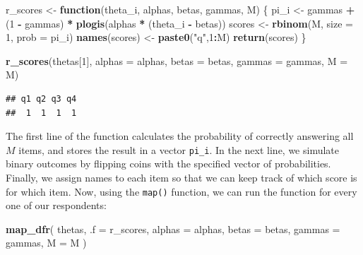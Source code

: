 \documentclass[
]{book}
\newenvironment{Shaded}{\begin{snugshade}}{\end{snugshade}}
\newcommand{\AttributeTok}[1]{\textcolor[rgb]{0.13,0.29,0.53}{#1}}
\newcommand{\ControlFlowTok}[1]{\textcolor[rgb]{0.13,0.29,0.53}{\textbf{#1}}}
\newcommand{\DecValTok}[1]{\textcolor[rgb]{0.00,0.00,0.81}{#1}}
\newcommand{\FunctionTok}[1]{\textcolor[rgb]{0.13,0.29,0.53}{\textbf{#1}}}
\newcommand{\NormalTok}[1]{#1}
\newcommand{\OtherTok}[1]{\textcolor[rgb]{0.56,0.35,0.01}{#1}}
\newcommand{\SpecialCharTok}[1]{\textcolor[rgb]{0.81,0.36,0.00}{\textbf{#1}}}
\newcommand{\StringTok}[1]{\textcolor[rgb]{0.31,0.60,0.02}{#1}}
\begin{document}
\begin{Shaded}
\begin{Highlighting}[]
\NormalTok{r\_scores }\OtherTok{\textless{}{-}} \ControlFlowTok{function}\NormalTok{(theta\_i, alphas, betas, gammas, M) \{}
\NormalTok{  pi\_i }\OtherTok{\textless{}{-}}\NormalTok{ gammas }\SpecialCharTok{+}\NormalTok{ (}\DecValTok{1} \SpecialCharTok{{-}}\NormalTok{ gammas) }\SpecialCharTok{*} \FunctionTok{plogis}\NormalTok{(alphas }\SpecialCharTok{*}\NormalTok{ (theta\_i }\SpecialCharTok{{-}}\NormalTok{ betas))}
\NormalTok{  scores }\OtherTok{\textless{}{-}} \FunctionTok{rbinom}\NormalTok{(M, }\AttributeTok{size =} \DecValTok{1}\NormalTok{, }\AttributeTok{prob =}\NormalTok{ pi\_i)}
  \FunctionTok{names}\NormalTok{(scores) }\OtherTok{\textless{}{-}} \FunctionTok{paste0}\NormalTok{(}\StringTok{"q"}\NormalTok{,}\DecValTok{1}\SpecialCharTok{:}\NormalTok{M)}
  \FunctionTok{return}\NormalTok{(scores)}
\NormalTok{\}}

\FunctionTok{r\_scores}\NormalTok{(thetas[}\DecValTok{1}\NormalTok{], }\AttributeTok{alphas =}\NormalTok{ alphas, }\AttributeTok{betas =}\NormalTok{ betas, }
         \AttributeTok{gammas =}\NormalTok{ gammas, }\AttributeTok{M =}\NormalTok{ M)}
\end{Highlighting}
\end{Shaded}

\begin{verbatim}
## q1 q2 q3 q4 
##  1  1  1  1
\end{verbatim}

The first line of the function calculates the probability of correctly answering all \(M\) items, and stores the result in a vector \texttt{pi\_i}.
In the next line, we simulate binary outcomes by flipping coins with the specified vector of probabilities.
Finally, we assign names to each item so that we can keep track of which score is for which item.
Now, using the \texttt{map()} function, we can run the function for every one of our respondents:

\begin{Shaded}
\begin{Highlighting}[]
\FunctionTok{map\_dfr}\NormalTok{(}
\NormalTok{  thetas, }\AttributeTok{.f =}\NormalTok{ r\_scores, }
  \AttributeTok{alphas =}\NormalTok{ alphas, }\AttributeTok{betas =}\NormalTok{ betas, }\AttributeTok{gammas =}\NormalTok{ gammas, }\AttributeTok{M =}\NormalTok{ M}
\NormalTok{)}
\end{Highlighting}
\end{Shaded}
\end{document}
